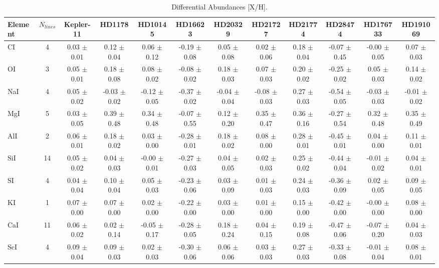 \documentclass[oneside]{emulateapj}
\begin{document}
\begin{table}
\caption{Differential Abundances [X/H].}
\label{tbl:abund}
\begin{tabular}{lccccccccccc} 
\hline    
\hline 
{Element} & $N_{lines}$ & Kepler-11 & HD1178 & HD10145 & HD16623 & HD20329 & HD21727 & HD21774 & HD28474 & HD176733 & HD191069 \\
\hline
CI & 4 & 0.03 $\pm$ 0.01 & 0.12 $\pm$ 0.04 & 0.06 $\pm$ 0.12 & -0.19 $\pm$ 0.08 & 0.05 $\pm$ 0.08 & 0.02 $\pm$ 0.06 & 0.18 $\pm$ 0.04 & -0.07 $\pm$ 0.45 & -0.00 $\pm$ 0.05 & 0.07 $\pm$ 0.03 \\
OI & 3 & 0.05 $\pm$ 0.01 & 0.18 $\pm$ 0.08 & 0.08 $\pm$ 0.02 & -0.08 $\pm$ 0.02 & 0.18 $\pm$ 0.03 & 0.07 $\pm$ 0.03 & 0.20 $\pm$ 0.02 & -0.25 $\pm$ 0.02 & 0.05 $\pm$ 0.03 & 0.14 $\pm$ 0.02 \\
NaI & 4 & 0.05 $\pm$ 0.02 & -0.03 $\pm$ 0.02 & -0.12 $\pm$ 0.05 & -0.37 $\pm$ 0.02 & -0.04 $\pm$ 0.04 & -0.08 $\pm$ 0.03 & 0.27 $\pm$ 0.03 & -0.54 $\pm$ 0.05 & -0.03 $\pm$ 0.03 & -0.01 $\pm$ 0.02 \\
MgI & 5 & 0.03 $\pm$ 0.05 & 0.39 $\pm$ 0.48 & 0.34 $\pm$ 0.48 & -0.07 $\pm$ 0.55 & 0.12 $\pm$ 0.20 & 0.35 $\pm$ 0.47 & 0.36 $\pm$ 0.16 & -0.27 $\pm$ 0.54 & 0.32 $\pm$ 0.48 & 0.35 $\pm$ 0.49 \\
AlI & 2 & 0.06 $\pm$ 0.01 & 0.18 $\pm$ 0.02 & 0.03 $\pm$ 0.00 & -0.28 $\pm$ 0.01 & 0.18 $\pm$ 0.02 & 0.08 $\pm$ 0.00 & 0.28 $\pm$ 0.01 & -0.45 $\pm$ 0.01 & 0.04 $\pm$ 0.00 & 0.11 $\pm$ 0.01 \\
SiI & 14 & 0.05 $\pm$ 0.02 & 0.04 $\pm$ 0.03 & -0.00 $\pm$ 0.01 & -0.27 $\pm$ 0.03 & 0.04 $\pm$ 0.05 & 0.02 $\pm$ 0.03 & 0.25 $\pm$ 0.02 & -0.44 $\pm$ 0.04 & -0.01 $\pm$ 0.02 & 0.04 $\pm$ 0.01 \\
SI & 4 & 0.04 $\pm$ 0.04 & 0.10 $\pm$ 0.04 & 0.05 $\pm$ 0.03 & -0.23 $\pm$ 0.06 & 0.03 $\pm$ 0.09 & 0.01 $\pm$ 0.03 & 0.24 $\pm$ 0.03 & -0.36 $\pm$ 0.09 & 0.02 $\pm$ 0.05 & 0.09 $\pm$ 0.05 \\
KI & 1 & 0.07 $\pm$ 0.00 & 0.07 $\pm$ 0.00 & 0.02 $\pm$ 0.00 & -0.22 $\pm$ 0.00 & 0.03 $\pm$ 0.00 & 0.01 $\pm$ 0.00 & 0.15 $\pm$ 0.00 & -0.42 $\pm$ 0.00 & -0.00 $\pm$ 0.00 & 0.08 $\pm$ 0.00 \\
CaI & 11 & 0.06 $\pm$ 0.02 & 0.02 $\pm$ 0.14 & -0.05 $\pm$ 0.17 & -0.28 $\pm$ 0.05 & 0.18 $\pm$ 0.24 & 0.04 $\pm$ 0.15 & 0.19 $\pm$ 0.08 & -0.47 $\pm$ 0.06 & -0.07 $\pm$ 0.20 & 0.04 $\pm$ 0.03 \\
ScI & 4 & 0.09 $\pm$ 0.04 & 0.09 $\pm$ 0.03 & 0.02 $\pm$ 0.03 & -0.30 $\pm$ 0.06 & 0.06 $\pm$ 0.06 & 0.03 $\pm$ 0.03 & 0.27 $\pm$ 0.03 & -0.33 $\pm$ 0.08 & -0.01 $\pm$ 0.04 & 0.08 $\pm$ 0.01 \\

\end{tabular}
\end{table}
\end{document}
